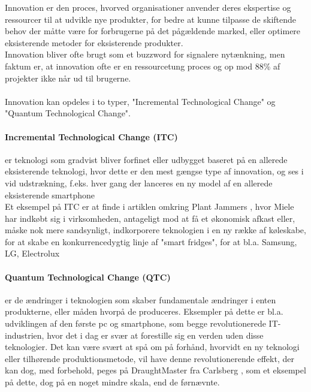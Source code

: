 Innovation er den proces, hvorved organisationer anvender deres ekspertise og
ressourcer til at udvikle nye produkter, for bedre at kunne tilpasse de skiftende
behov der måtte være for forbrugerne på det pågældende marked, eller optimere eksisterende metoder for eksisterende produkter.\\
Innovation bliver ofte brugt som et buzzword for signalere nytænkning, men faktum er, at innovation ofte er en ressourcetung proces og op mod 88\% af projekter ikke når ud til brugerne\cite[s. 388]{jones:2013}.\\~\\
Innovation kan opdeles i to typer, "Incremental Technological Change" og "Quantum Technological Change".
\\\paragraph{Incremental Technological Change (ITC)} er teknologi som gradvist bliver forfinet eller udbygget baseret på en allerede
eksisterende teknologi, hvor dette er den mest gængse type af innovation, og ses i vid udstrækning, f.eks. hver gang der lanceres en ny model af en allerede eksisterende smartphone\\
Et eksempel på ITC er at finde i artiklen omkring Plant Jammers \cite[a.3]{eksamensopgave}, hvor Miele
har indkøbt sig i virksomheden, antageligt mod at få et økonomisk afkast eller, måske nok mere sandsynligt, indkorporere teknologien
i en ny række af køleskabe, for at skabe en konkurrencedygtig linje af "smart fridges", for at bl.a. Samsung, LG, Electrolux \cite{fridgemarketshare1, fridgemarketshare2}
\\\paragraph{Quantum Technological Change (QTC)} er de ændringer i teknologien som skaber fundamentale ændringer i enten produkterne, eller måden hvorpå de produceres.
Eksempler på dette er bl.a. udviklingen af den første pc og smartphone, som begge revolutionerede IT-industrien, hvor det i dag er svær at forestille sig en verden
uden disse teknologier. Det kan være svært at spå om på forhånd, hvorvidt en ny teknologi eller tilhørende produktionsmetode, vil have denne revolutionerende effekt, der kan dog, med forbehold,
peges på DraughtMaster fra Carlsberg \cite[a.2]{eksamensopgave}, som et eksempel på dette, dog på en noget mindre skala, end de førnævnte.\\
